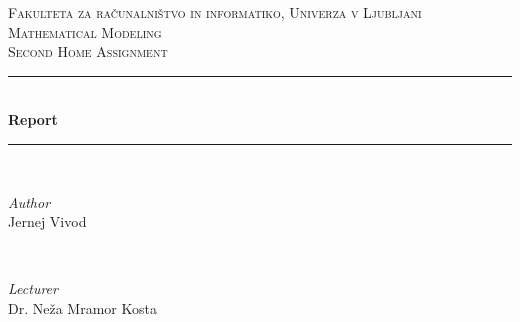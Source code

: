 \documentclass[A4]{article}
\begin{document}
\begin{titlepage} %
	\newcommand{\HRule}{\rule{\linewidth}{0.5mm}} %
	
	\center %
	
	
	\textsc{\LARGE Fakulteta za računalništvo in informatiko, Univerza v Ljubljani}\\[1.5cm] %
	
	\textsc{\Large Mathematical Modeling}\\[0.5cm] %
	
	\textsc{\large Second Home Assignment}\\[0.5cm] %
	
	
	\HRule\\[0.4cm]
	
	{\huge\bfseries Report}\\[0.4cm] %
	
	\HRule\\[1.5cm]
	
	
	\begin{minipage}{0.4\textwidth}
		\begin{flushleft}
			\large
			\textit{Author}\\
			Jernej Vivod %
		\end{flushleft}
	\end{minipage}
	~
	\begin{minipage}{0.4\textwidth}
		\begin{flushright}
			\large
			\textit{Lecturer}\\
			Dr. Neža Mramor Kosta
		\end{flushright}
	\end{minipage}
	
	

\end{titlepage}
\end{document}
